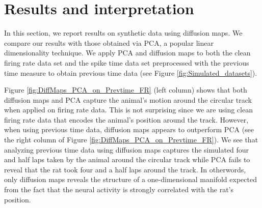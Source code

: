 
\section{Results and interpretation}
In this section, we report results on  synthetic data using diffusion maps. We compare our results with those obtained via PCA, a popular linear dimensionality technique. We apply PCA and diffusion maps to both the 
clean firing rate data set and the spike time data set preprocessed  with the previous time measure to obtain previous time data (see Figure \ref{fig:Simulated_datasets}).


Figure \ref{fig:DiffMaps_PCA_on_Prevtime_FR} (left column) shows that both diffusion maps  and PCA capture the animal's motion around the circular track when applied on firing rate data. This is not surprising since we are using clean firing rate data that encodes the animal's position around the track. However, when using previous time data, diffusion maps  appears to outperform PCA (see the right column of Figure  \ref{fig:DiffMaps_PCA_on_Prevtime_FR}). We  see that analyzing previous time data using diffusion maps captures the simulated four and half laps taken by the animal around the circular track while PCA  fails to reveal that the rat took four and a half laps  around the track. 
In otherwords, only diffusion maps  reveals the structure of a one-dimensional  manifold expected from the fact that 
the neural activity is strongly correlated with the rat's position.


